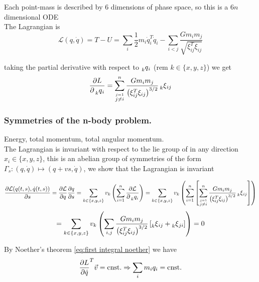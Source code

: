 \documentclass[12pt]{article}
\begin{document}
Each point-mass is described by 6 dimensions of phase space, so this is a 6$n$ dimensional ODE\\

The Lagrangian is 
\begin{equation}\label{eq:lagrangian n bodies}
    \mathcal L(q,\dot q) = T - U = \sum_i \frac{1}{2}m_i \dot q_i^T\dot q_i - \sum_{i<j}\frac{Gm_im_j}{\sqrt{\xi_{ij}^T\xi_{ij}}}
\end{equation}

taking the partial derivative with respect to $\prescript{}{k}{q}_{i}$ (rem $k\in\{x,y,z\}$) we get
\begin{equation}\label{eq:partial lagrangian wrt qi}
    \frac{\partial L}{\partial \prescript{}{k}{q}_i} = \sum_{\stackrel{j=1}{j\neq i}}^n \frac{Gm_im_j}{\left( \xi_{ij}^T\xi_{ij} \right)^{3/2}} \prescript{}{k}{\xi}_{ij}
\end{equation}



\subsubsection{Symmetries of the n-body problem.}
Energy, total momentum, total angular momentum. \\

The Lagrangian is invariant with respect to the lie group of  in any direction $x_i \in \{x,y,z\}$, this is an abelian group of symmetries of the form $\Gamma_s : (q,\dot q)\mapsto (q+vs,\dot q)$, we show that the Lagrangian is invariant

$$
\frac{\partial\mathcal L(q(t,s),\dot q(t,s))}{\partial s} = \frac{\partial\mathcal L}{\partial q}\frac{\partial q}{\partial s} = 
\sum_{k\in\{x,y,z\}} v_k\left( \sum_{i=1}^n \frac{\partial\mathcal L}{\partial \prescript{}{k}{q_i}}
\right)
= \sum_{k\in\{x,y,z\}} v_k\left(
\sum_{i=1}^n \left[
\sum_{\stackrel{j=1}{j\neq i}}^n \frac{Gm_im_j}{\left( \xi_{ij}^T\xi_{ij} \right)^{3/2}}\prescript{}{k}{\xi}_{ij}
\right] \right)
$$
$$
= \sum_{k\in\{x,y,z\}} v_k\left(
\sum_{i,j} \frac{Gm_im_j}{\left(\xi_{ij}^T\xi_{ij}\right)^{3/2}}\left[ \prescript{}{k}{\xi}_{ij} + \prescript{}{k}{\xi}_{ji} \right]
\right) = 0
$$

By Noether's theorem \eqref{eq:first integral noether} we have
\begin{equation}\label{eq:conserved total momentum}
    \frac{\partial L}{\partial \dot q}^T \vec v = \text{cnst.} \Rightarrow \sum_i m_iq_i = \text{cnst.}
\end{equation}
\end{document}
